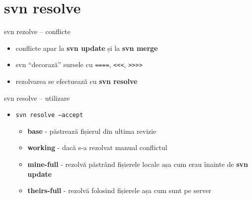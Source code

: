 \documentclass{beamer}
\begin{document}
\section{svn resolve}
\frame{\tableofcontents[currentsection]}

\begin{frame}{svn rezolve – conflicte}
  \begin{itemize}[<+->]
    \item conflicte apar la \textbf{svn update} și la \textbf{svn merge}
    \item svn ``decorază'' sursele cu \texttt{====}, \texttt{<<<}, \texttt{>>>>}
    \item rezolvarea se efectuează cu \textbf{svn resolve}
  \end{itemize}
\end{frame}


\begin{frame}{svn resolve – utilizare}
  \begin{itemize}[<+->]
    \item \texttt{svn resolve --accept}
      \begin{itemize}[<+->]
      \item \textbf{base} - păstrează fișierul din ultima revizie
      \item \textbf{working} - dacă s-a rezolvat manual conflictul
      \item \textbf{mine-full} - rezolvă păstrând fișierele locale așa cum erau înainte de \textbf{svn update}
      \item \textbf{theirs-full} - rezolvă folosind fișierele așa cum sunt pe server
      \end{itemize}
  \end{itemize}
\end{frame}
\end{document}
